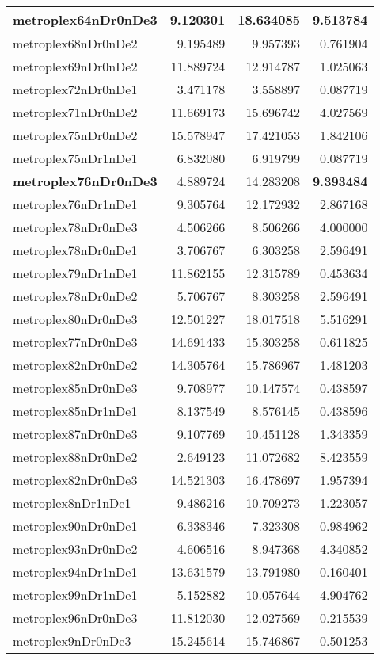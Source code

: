 \documentclass[../../../thesis.tex]{subfiles}
\begin{document}
\begin{longtable}{|l|r|r|r|}
\textbf{metroplex64nDr0nDe3} & 9.120301 & 18.634085 & \textbf{9.513784} \\\hline
metroplex68nDr0nDe2 & 9.195489 & 9.957393 & 0.761904 \\\hline
metroplex69nDr0nDe2 & 11.889724 & 12.914787 & 1.025063 \\\hline
metroplex72nDr0nDe1 & 3.471178 & 3.558897 & 0.087719 \\\hline
metroplex71nDr0nDe2 & 11.669173 & 15.696742 & 4.027569 \\\hline
metroplex75nDr0nDe2 & 15.578947 & 17.421053 & 1.842106 \\\hline
metroplex75nDr1nDe1 & 6.832080 & 6.919799 & 0.087719 \\\hline
\textbf{metroplex76nDr0nDe3} & 4.889724 & 14.283208 & \textbf{9.393484} \\\hline
metroplex76nDr1nDe1 & 9.305764 & 12.172932 & 2.867168 \\\hline
metroplex78nDr0nDe3 & 4.506266 & 8.506266 & 4.000000 \\\hline
metroplex78nDr0nDe1 & 3.706767 & 6.303258 & 2.596491 \\\hline
metroplex79nDr1nDe1 & 11.862155 & 12.315789 & 0.453634 \\\hline
metroplex78nDr0nDe2 & 5.706767 & 8.303258 & 2.596491 \\\hline
metroplex80nDr0nDe3 & 12.501227 & 18.017518 & 5.516291 \\\hline
metroplex77nDr0nDe3 & 14.691433 & 15.303258 & 0.611825 \\\hline
metroplex82nDr0nDe2 & 14.305764 & 15.786967 & 1.481203 \\\hline
metroplex85nDr0nDe3 & 9.708977 & 10.147574 & 0.438597 \\\hline
metroplex85nDr1nDe1 & 8.137549 & 8.576145 & 0.438596 \\\hline
metroplex87nDr0nDe3 & 9.107769 & 10.451128 & 1.343359 \\\hline
metroplex88nDr0nDe2 & 2.649123 & 11.072682 & 8.423559 \\\hline
metroplex82nDr0nDe3 & 14.521303 & 16.478697 & 1.957394 \\\hline
metroplex8nDr1nDe1 & 9.486216 & 10.709273 & 1.223057 \\\hline
metroplex90nDr0nDe1 & 6.338346 & 7.323308 & 0.984962 \\\hline
metroplex93nDr0nDe2 & 4.606516 & 8.947368 & 4.340852 \\\hline
metroplex94nDr1nDe1 & 13.631579 & 13.791980 & 0.160401 \\\hline
metroplex99nDr1nDe1 & 5.152882 & 10.057644 & 4.904762 \\\hline
metroplex96nDr0nDe3 & 11.812030 & 12.027569 & 0.215539 \\\hline
metroplex9nDr0nDe3 & 15.245614 & 15.746867 & 0.501253 \\\hline
\end{longtable}
\end{document}
